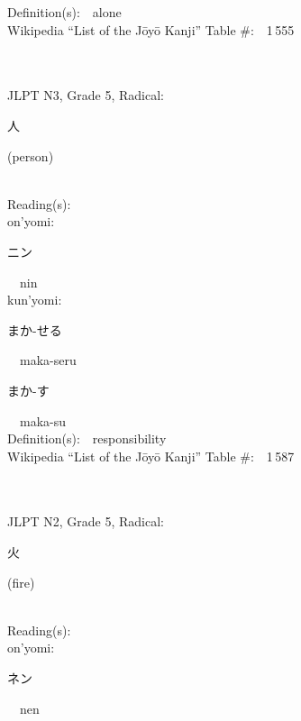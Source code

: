 \begin{multicols}{2}
Definition(s):\ \ alone \\
Wikipedia ``List of the J\=oy\=o Kanji'' Table \#:\ \ 1\,555 \\
\ \ \\
{\fontsize{34pt}{40pt}  }\ \ \\  %
{JLPT N3, Grade 5, Radical:\ \ {\begin{CJK}{UTF8}{min} 人 \end{CJK}} (person) } \\
Reading(s):\ \ \\
{\hspace*{1em}}on'yomi:\ \ \\
{\hspace*{2em}}{\begin{CJK}{UTF8}{min} ニン \end{CJK}}\ \ nin\ \ \\
{\hspace*{1em}}kun'yomi:\ \ \\
{\hspace*{2em}}{\begin{CJK}{UTF8}{min} まか-せる \end{CJK}}\ \ maka-seru\ \ \\
{\hspace*{2em}}{\begin{CJK}{UTF8}{min} まか-す \end{CJK}}\ \ maka-su\ \ \\
Definition(s):\ \ responsibility \\
Wikipedia ``List of the J\=oy\=o Kanji'' Table \#:\ \ 1\,587 \\
\ \ \\
{\fontsize{34pt}{40pt}  }\ \ \\  %
{JLPT N2, Grade 5, Radical:\ \ {\begin{CJK}{UTF8}{min} 火 \end{CJK}} (fire) } \\
Reading(s):\ \ \\
{\hspace*{1em}}on'yomi:\ \ \\
{\hspace*{2em}}{\begin{CJK}{UTF8}{min} ネン \end{CJK}}\ \ nen\ \ \\

\end{multicols}
